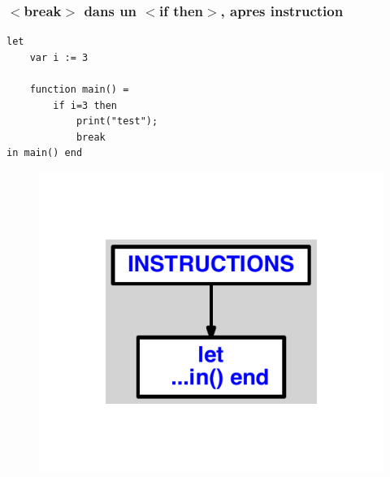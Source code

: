 \documentclass{article}
\begin{document}
\subsubsection{$ < $break$ > $ dans un $ < $if then$ > $, apres instruction}
\begin{lstlisting}
let
	var i := 3

	function main() =
		if i=3 then
			print("test");
			break
in main() end
\end{lstlisting}
\newpage
\begin{figure}[H]
\centering
\includegraphics[max width=\textwidth]{ast/ast_16.pdf}
\end{figure}
\newpage
\end{document}
